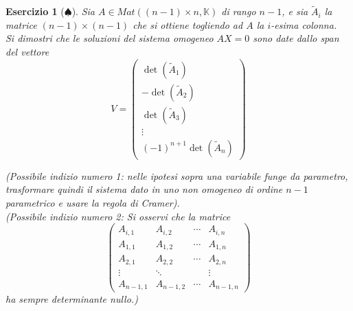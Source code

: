 \documentclass{article}
\newtheorem{es}{Esercizio}
\begin{document}
{\begin{es}[$\spadesuit$]
    Sia $A\in Mat((n-1)\times n,\mathbb{K})$ di rango $n-1$, e sia $\tilde{A}_i$ la matrice $(n-1)\times (n-1)$ che si ottiene togliendo ad $A$ la $i$-esima colonna.\\
    Si dimostri che le soluzioni del sistema omogeneo $AX=0$ sono date dallo span del vettore  $$V=\begin{pmatrix}
        \det(\tilde{A}_1)\\
        -\det(\tilde{A}_2)\\
        \det(\tilde{A}_3)\\
        \vdots\\
        (-1)^{n+1} \det(\tilde{A}_n)
    \end{pmatrix}$$

    
    
    (Possibile indizio numero 1: nelle ipotesi sopra una variabile funge da parametro, trasformare quindi il sistema dato in uno non omogeneo di ordine $n-1$ parametrico e usare la regola di Cramer).\\
    (Possibile indizio numero 2: Si osservi che la matrice
    $$\begin{pmatrix}
        A_{i,1} & A_{i,2} & \cdots & A_{i,n}\\
        A_{1,1} & A_{1,2} & \cdots & A_{1,n}\\
        A_{2,1} & A_{2,2} & \cdots & A_{2,n}\\
        \vdots & \ddots & & \vdots\\
        A_{n-1,1} & A_{n-1,2} & \cdots & A_{n-1,n} 
    \end{pmatrix}$$
    ha sempre determinante nullo.)
\end{es}

}
\end{document}
